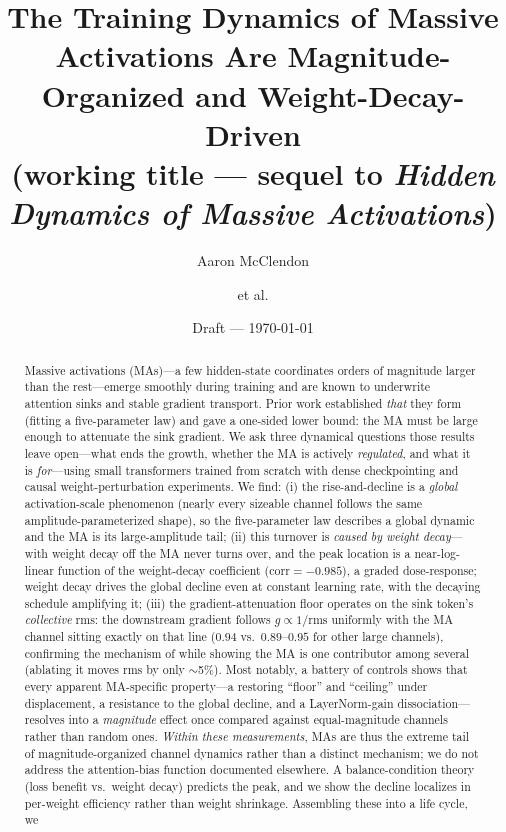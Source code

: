\documentclass[11pt]{article}
\title{\bfseries The Training Dynamics of Massive Activations Are
Magnitude-Organized and Weight-Decay-Driven\\[2pt]
\large (working title --- sequel to \emph{Hidden Dynamics of Massive Activations})}
\author[1]{Aaron McClendon}
\author[1]{et al.}
\affil[1]{Arkitekt AI}
\date{Draft --- \today}
\newcommand{\rms}{\mathrm{rms}}
\begin{document}
\maketitle

\begin{abstract}
Massive activations (MAs)---a few hidden-state coordinates orders of magnitude
larger than the rest---emerge smoothly during training and are known to underwrite
attention sinks and stable gradient transport. Prior work established \emph{that}
they form (fitting a five-parameter law) and gave a one-sided lower bound: the MA
must be large enough to attenuate the sink gradient. We ask three dynamical
questions those results leave open---what ends the growth, whether the MA is
actively \emph{regulated}, and what it is \emph{for}---using small transformers
trained from scratch with dense checkpointing and causal weight-perturbation
experiments. We find: (i) the rise-and-decline is a \emph{global}
activation-scale phenomenon (nearly every sizeable channel follows the same
amplitude-parameterized shape), so the five-parameter law describes a global
dynamic and the MA is its large-amplitude tail; (ii) this turnover is
\emph{caused by weight decay}---with weight decay off the MA never turns over, and
the peak location is a near-log-linear function of the weight-decay coefficient
($\mathrm{corr}=-0.985$), a graded dose-response; weight decay drives the global
decline even at constant learning rate, with the decaying schedule amplifying it;
(iii) the gradient-attenuation floor operates on the
sink token's \emph{collective} $\rms$: the downstream gradient follows
$g\propto 1/\rms$ uniformly with the MA channel sitting exactly on that line
($0.94$ vs.\ $0.89$--$0.95$ for other large channels), confirming the mechanism of
\citet{chen2026gradient} while showing the MA is one contributor among several
(ablating it moves $\rms$ by only $\sim$5\%). Most notably, a battery of controls
shows that every apparent MA-specific property---a restoring ``floor'' and
``ceiling'' under displacement, a resistance to the global decline, and a
LayerNorm-gain dissociation---resolves into a \emph{magnitude} effect once compared
against equal-magnitude channels rather than random ones. \emph{Within these
measurements}, MAs are thus the extreme tail of magnitude-organized channel
dynamics rather than a distinct mechanism; we do not address the attention-bias
function documented elsewhere. A balance-condition theory (loss benefit vs.\ weight
decay) predicts the peak, and we show the decline localizes in per-weight
efficiency rather than weight shrinkage. Assembling these into a life cycle, we

\end{abstract}
\end{document}
